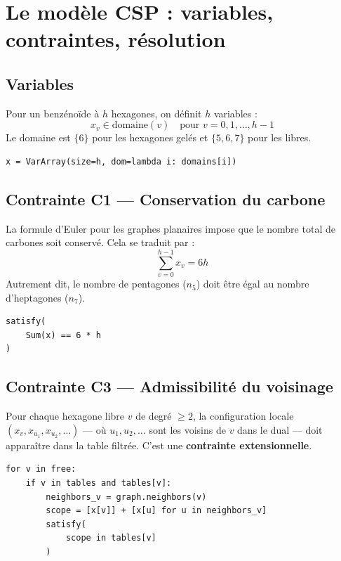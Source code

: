 \section{Le modèle CSP : variables, contraintes, résolution}

\subsection{Variables}

Pour un benzénoïde à $h$ hexagones, on définit $h$ variables :
\[
  x_v \in \text{domaine}(v) \quad \text{pour } v = 0, 1, \ldots, h-1
\]
Le domaine est $\{6\}$ pour les hexagones gelés et $\{5, 6, 7\}$ pour les libres.

\begin{lstlisting}
x = VarArray(size=h, dom=lambda i: domains[i])
\end{lstlisting}

\subsection{Contrainte C1 — Conservation du carbone}

La formule d'Euler pour les graphes planaires impose que le nombre total de carbones soit
conservé. Cela se traduit par :
\[
  \sum_{v=0}^{h-1} x_v = 6h
\]
Autrement dit, le nombre de pentagones ($n_5$) doit être égal au nombre d'heptagones ($n_7$).

\begin{lstlisting}
satisfy(
    Sum(x) == 6 * h
)
\end{lstlisting}

\subsection{Contrainte C3 — Admissibilité du voisinage}

Pour chaque hexagone libre $v$ de degré $\geq 2$, la configuration locale
$(x_v, x_{u_1}, x_{u_2}, \ldots)$ — où $u_1, u_2, \ldots$ sont les voisins de $v$ dans le
dual — doit apparaître dans la table filtrée. C'est une \textbf{contrainte extensionnelle}.

\begin{lstlisting}
for v in free:
    if v in tables and tables[v]:
        neighbors_v = graph.neighbors(v)
        scope = [x[v]] + [x[u] for u in neighbors_v]
        satisfy(
            scope in tables[v]
        )
\end{lstlisting}

